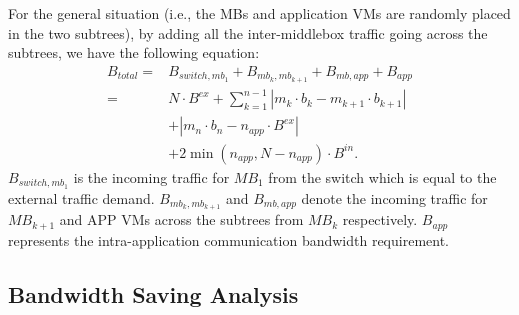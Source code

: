 \documentclass[review]{elsarticle}
\begin{document}
For the general situation (i.e., the MBs and application VMs are randomly placed in the two subtrees), by adding all the inter-middlebox traffic going across the subtrees, we have the following equation:
\begin{equation}
\begin{aligned}
B_{total}= &B_{switch,mb_{1}}+B_{mb_k,mb_{k+1}}+B_{mb,app}+B_{app}\\
 =&N\cdot B^{ex}+\sum\limits_{k=1}^{n-1}|m_k\cdot b_k-m_{k+1}\cdot b_{k+1}|\\
&+|m_n\cdot b_n-n_{app}\cdot B^{ex}|
\\&+2\min(n_{app}, N-n_{app})\cdot B^{in}.
\end{aligned}
\label{equ:bw_equation}
\end{equation}
%
$B_{switch,mb_1}$ is the incoming traffic for $MB_1$ from the switch which is equal to the external traffic demand. $B_{mb_k,mb_{k+1}}$ and $B_{mb,app}$ denote the incoming traffic for $MB_{k+1}$ and APP VMs across the subtrees from $MB_k$ respectively. $B_{app}$ represents the intra-application communication bandwidth requirement.

\subsection{Bandwidth Saving Analysis}
\end{document}
